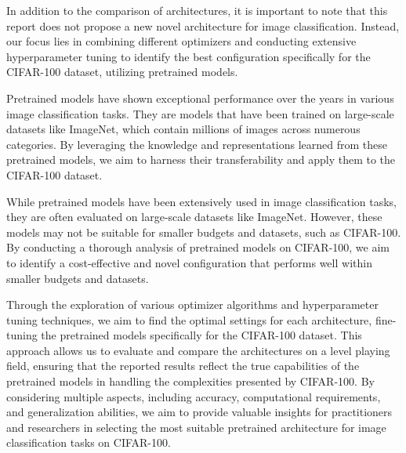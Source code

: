 \documentclass{article}
\begin{document}


In addition to the comparison of architectures, it is important to note that this report does not propose a new novel architecture for image classification. 
Instead, our focus lies in combining different optimizers and conducting extensive hyperparameter tuning to identify the best configuration specifically for the CIFAR-100 dataset, utilizing pretrained models.

Pretrained models have shown exceptional performance over the years in various image classification tasks. They are models that have been trained on large-scale datasets like ImageNet, which contain millions of images across numerous categories. 
By leveraging the knowledge and representations learned from these pretrained models, we aim to harness their transferability and apply them to the CIFAR-100 dataset.



While pretrained models have been extensively used in image classification tasks, they are often evaluated on large-scale datasets like ImageNet. However, these models may not be suitable for smaller budgets and datasets, such as CIFAR-100. By conducting a thorough analysis of pretrained models on CIFAR-100, we aim to identify a cost-effective and novel configuration that performs well within smaller budgets and datasets.


Through the exploration of various optimizer algorithms and hyperparameter tuning techniques, we aim to find the optimal settings for each architecture, fine-tuning the pretrained models specifically for the CIFAR-100 dataset. 
This approach allows us to evaluate and compare the architectures on a level playing field, ensuring that the reported results reflect the true capabilities of the pretrained models in handling the complexities presented by CIFAR-100. 
By considering multiple aspects, including accuracy, computational requirements, and generalization abilities, we aim to provide valuable insights for practitioners and researchers in selecting the most suitable pretrained architecture for image classification tasks on CIFAR-100.
\end{document}
